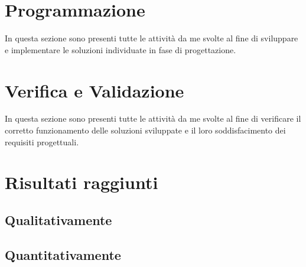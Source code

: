 \section{Programmazione}
In questa sezione sono presenti tutte le attività da me svolte al fine di sviluppare e implementare le soluzioni individuate in fase di progettazione.

\section{Verifica e Validazione}
In questa sezione sono presenti tutte le attività da me svolte al fine di verificare il corretto funzionamento delle soluzioni sviluppate e il loro soddisfacimento dei requisiti progettuali.

\section{Risultati raggiunti}
\subsection{Qualitativamente}
%

\subsection{Quantitativamente}
%
